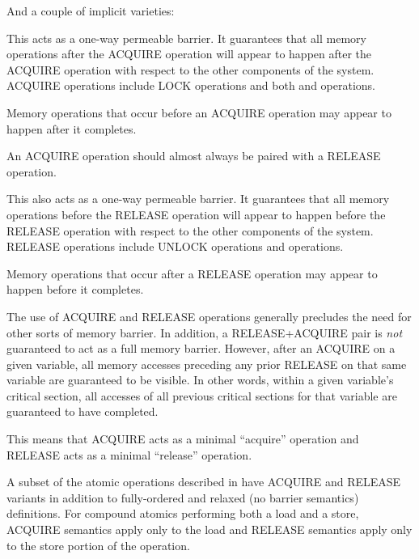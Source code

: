 And a couple of implicit varieties:

\begin{description}[style=nextline]
 \item[ACQUIRE operations:]
     This acts as a one-way permeable barrier.
     It guarantees that all memory operations after the ACQUIRE operation
     will appear to happen after the ACQUIRE operation with respect to the
     other components of the system.
     ACQUIRE operations include LOCK operations and both 
     and  operations.

     Memory operations that occur before an ACQUIRE operation may appear to
     happen after it completes.

     An ACQUIRE operation should almost always be paired with a RELEASE
     operation.


 \item[RELEASE operations:]
     This also acts as a one-way permeable barrier.
     It guarantees that all memory operations before the RELEASE operation
     will appear to happen before the RELEASE operation with respect to
     the other components of the system.
     RELEASE operations include UNLOCK operations and 
     operations.

     Memory operations that occur after a RELEASE operation may appear to
     happen before it completes.

     The use of ACQUIRE and RELEASE operations generally precludes the need
     for other sorts of memory barrier.
     In addition, a RELEASE+ACQUIRE pair is \emph{not} guaranteed to act
     as a full memory barrier.
     However, after an ACQUIRE on a given variable, all memory accesses
     preceding any prior RELEASE on that same variable are guaranteed to
     be visible.
     In other words, within a given variable's critical section, all
     accesses of all previous critical sections for that variable are
     guaranteed to have completed.

     This means that ACQUIRE acts as a minimal ``acquire'' operation and
     RELEASE acts as a minimal ``release'' operation.
\end{description}

A subset of the atomic operations described in  have
ACQUIRE and RELEASE variants in addition to fully-ordered and relaxed
(no barrier semantics) definitions.
For compound atomics performing both a load and a store, ACQUIRE semantics
apply only to the load and RELEASE semantics apply only to the store portion
of the operation.

